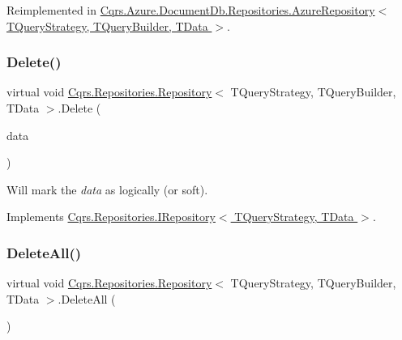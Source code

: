 Reimplemented in \hyperlink{classCqrs_1_1Azure_1_1DocumentDb_1_1Repositories_1_1AzureRepository_ac9ceeed80a02ced9a45b3443cd1f453f_ac9ceeed80a02ced9a45b3443cd1f453f}{Cqrs.\+Azure.\+Document\+Db.\+Repositories.\+Azure\+Repository$<$ T\+Query\+Strategy, T\+Query\+Builder, T\+Data $>$}.

\mbox{\label{classCqrs_1_1Repositories_1_1Repository_ac9d88baa6afcea85553fd233ba406e48_ac9d88baa6afcea85553fd233ba406e48}} 
\subsubsection{\texorpdfstring{Delete()}{Delete()}}
{\footnotesize\ttfamily virtual void \hyperlink{classCqrs_1_1Repositories_1_1Repository}{Cqrs.\+Repositories.\+Repository}$<$ T\+Query\+Strategy, T\+Query\+Builder, T\+Data $>$.Delete (\begin{DoxyParamCaption}\item[{T\+Data}]{data }\end{DoxyParamCaption})\hspace{0.3cm}{\ttfamily [virtual]}}



Will mark the {\itshape data}  as logically (or soft). 



Implements \hyperlink{interfaceCqrs_1_1Repositories_1_1IRepository_a71c60de3588a757da2d25350c98374fd_a71c60de3588a757da2d25350c98374fd}{Cqrs.\+Repositories.\+I\+Repository$<$ T\+Query\+Strategy, T\+Data $>$}.

\mbox{\label{classCqrs_1_1Repositories_1_1Repository_a6b6b50d476a351fc7fbd194cb8fa44d0_a6b6b50d476a351fc7fbd194cb8fa44d0}} 
\subsubsection{\texorpdfstring{Delete\+All()}{DeleteAll()}}
{\footnotesize\ttfamily virtual void \hyperlink{classCqrs_1_1Repositories_1_1Repository}{Cqrs.\+Repositories.\+Repository}$<$ T\+Query\+Strategy, T\+Query\+Builder, T\+Data $>$.Delete\+All (\begin{DoxyParamCaption}{ }\end{DoxyParamCaption})\hspace{0.3cm}{\ttfamily [virtual]}}



